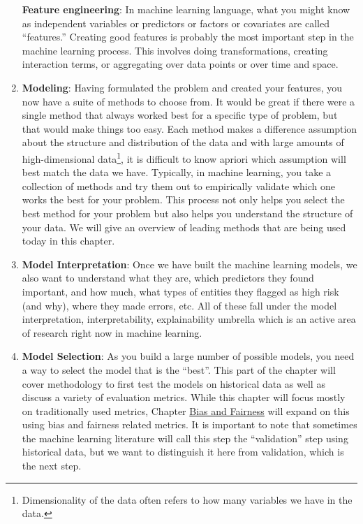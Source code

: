 \documentclass[]{krantz}
\begin{document}
\begin{enumerate}
  \textbf{Feature engineering}: In machine learning language, what you
  might know as independent variables or predictors or factors or
  covariates are called ``features.'' Creating good features is probably
  the most important step in the machine learning process. This involves
  doing transformations, creating interaction terms, or aggregating over
  data points or over time and space.
\item
  \textbf{Modeling}: Having formulated the problem and created your
  features, you now have a suite of methods to choose from. It would be
  great if there were a single method that always worked best for a
  specific type of problem, but that would make things too easy. Each
  method makes a difference assumption about the structure and
  distribution of the data and with large amounts of high-dimensional
  data\footnote{Dimensionality of the data often refers to how many
    variables we have in the data.}, it is difficult to know apriori
  which assumption will best match the data we have. Typically, in
  machine learning, you take a collection of methods and try them out to
  empirically validate which one works the best for your problem. This
  process not only helps you select the best method for your problem but
  also helps you understand the structure of your data. We will give an
  overview of leading methods that are being used today in this chapter.
\item
  \textbf{Model Interpretation}: Once we have built the machine learning
  models, we also want to understand what they are, which predictors
  they found important, and how much, what types of entities they
  flagged as high risk (and why), where they made errors, etc. All of
  these fall under the model interpretation, interpretability,
  explainability umbrella which is an active area of research right now
  in machine learning.
\item
  \textbf{Model Selection}: As you build a large number of possible
  models, you need a way to select the model that is the ``best''. This
  part of the chapter will cover methodology to first test the models on
  historical data as well as discuss a variety of evaluation metrics.
  While this chapter will focus mostly on traditionally used metrics,
  Chapter \protect\hyperlink{chap:bias}{Bias and Fairness} will expand
  on this using bias and fairness related metrics. It is important to
  note that sometimes the machine learning literature will call this
  step the ``validation'' step using historical data, but we want to
  distinguish it here from validation, which is the next step.

\end{enumerate}
\end{document}
